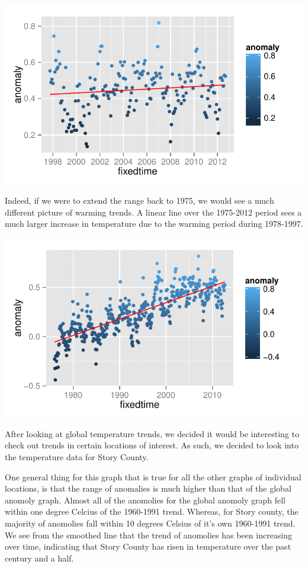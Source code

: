 \documentclass{article}\usepackage{graphicx, color}
\newenvironment{knitrout}{}{} %
\begin{document}
\begin{knitrout}
\color{fgcolor}\includegraphics[width=\linewidth]{figure/15-years} 
\end{knitrout}


Indeed, if we were to extend the range back to 1975, we would see a much different picture of warming trends. A linear line over the 1975-2012 period sees a much larger increase in temperature due to the warming period during 1978-1997.

\begin{knitrout}
\color{fgcolor}\includegraphics[width=\linewidth]{figure/recent-trend} 
\end{knitrout}


After looking at global temperature trends, we decided it would be interesting to check out trends in certain locations of interest. As such, we decided to look into the temperature data for Story County.

One general thing for this graph that is true for all the other graphs of individual locations, is that the range of anomalies is much higher than that of the global anomoly graph. Almost all of the anomolies for the global anomoly graph fell within one degree Celcius of the 1960-1991 trend. Whereas, for Story county, the majority of anomolies fall within 10 degrees Celsius of it's own 1960-1991 trend. We see from the smoothed line that the trend of anomolies has been increasing over time, indicating that Story County has risen in temperature over the past century and a half.
\end{document}
